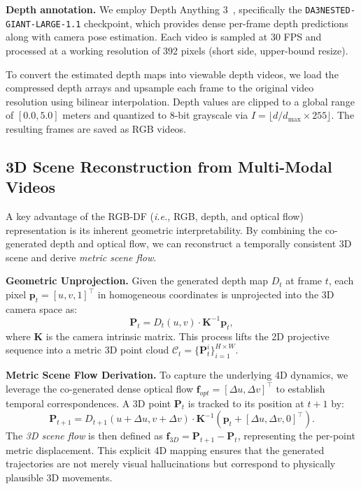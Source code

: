 \noindent 
\textbf{Depth annotation.}
We employ Depth Anything 3~\citep{lin2025depth}, specifically the \texttt{DA3NESTED-GIANT-LARGE-1.1} checkpoint, which provides dense per-frame depth predictions along with camera pose estimation. Each video is sampled at 30 FPS and processed at a working resolution of 392 pixels (short side, upper-bound resize).                                                                

To convert the estimated depth maps into viewable depth videos, we load the compressed depth arrays and upsample each frame to the original video resolution using bilinear interpolation. Depth values are clipped to a global range of $[0.0, 5.0]$ meters and quantized to 8-bit grayscale via $I = \lfloor d / d_{\max} \times 255 \rfloor$. The resulting frames are saved as RGB videos.



\subsection{3D Scene Reconstruction from Multi-Modal Videos}
\label{sec:3d_reconstruction}

A key advantage of the RGB-DF (\textit{i.e.}, RGB, depth, and optical flow) representation is its inherent geometric interpretability. By combining the co-generated depth and optical flow, we can reconstruct a temporally consistent 3D scene and derive \textit{metric scene flow}.

\noindent 
\textbf{Geometric Unprojection.}
Given the generated depth map $D_t$ at frame $t$, each pixel $\mathbf{p}_t = [u, v, 1]^\top$ in homogeneous coordinates is unprojected into the 3D camera space as:
\begin{equation}
    \mathbf{P}_t = D_t(u, v) \cdot \mathbf{K}^{-1} \mathbf{p}_t,
\end{equation}
where $\mathbf{K}$ is the camera intrinsic matrix. This process lifts the 2D projective sequence into a metric 3D point cloud $\mathcal{C}_t = \{\mathbf{P}_t^i\}_{i=1}^{H \times W}$.

\noindent 
\textbf{Metric Scene Flow Derivation.}
To capture the underlying 4D dynamics, we leverage the co-generated dense optical flow $\mathbf{f}_{opt} = [\Delta u, \Delta v]^\top$ to establish temporal correspondences. A 3D point $\mathbf{P}_t$ is tracked to its position at $t+1$ by:
\begin{equation}
    \mathbf{P}_{t+1} = D_{t+1}(u+\Delta u, v+\Delta v) \cdot \mathbf{K}^{-1} (\mathbf{p}_t + [\Delta u, \Delta v, 0]^\top).
\end{equation}
The \textit{3D scene flow} is then defined as $\mathbf{f}_{3D} = \mathbf{P}_{t+1} - \mathbf{P}_t$, representing the per-point metric displacement. This explicit 4D mapping ensures that the generated trajectories are not merely visual hallucinations but correspond to physically plausible 3D movements.

